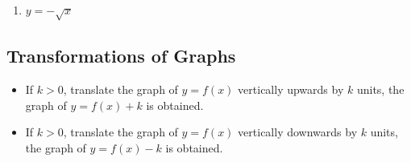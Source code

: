 \documentclass[12pt]{report}
\begin{document}
\begin{multicols}{2}
\begin{enumerate}[label=(\alph*)]
            \item $y = -\sqrt{x}$
                  \begin{center}
                  \end{center}
      \end{enumerate}
\end{multicols}

\newpage
\subsection*{Transformations of Graphs}

\begin{mdframed}[style=MyFrame]
      \begin{itemize}[leftmargin=0.3cm]
            \item If $k > 0$, translate the graph of $y = f (x)$ vertically upwards by $k$ units,
                  the graph of $y = f (x) + k$ is obtained.

            \item If $k > 0$, translate the graph of $y = f (x)$ vertically downwards by $k$
                  units, the graph of $y = f (x) - k$ is obtained.
      \end{itemize}
\end{mdframed}
\end{document}
